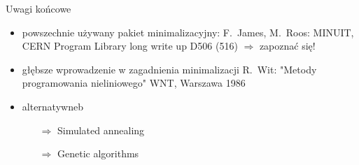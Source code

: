   \begin{frame}{Uwagi końcowe}
    \begin{itemize}
      \item powszechnie używany pakiet minimalizacyjny:
      F.~James, M.~Roos: MINUIT, CERN Program Library
      long write up D506 (516) $\Rightarrow$ zapoznać się!
      \item głębsze wprowadzenie w zagadnienia minimalizacji
      R.~Wit: "Metody programowania nieliniowego" WNT, Warszawa
      1986
      \item alternatywneb
      \begin{itemize}
        \item[$\Rightarrow$] Simulated annealing
        \item[$\Rightarrow$] Genetic algorithms
      \end{itemize}
    \end{itemize}
  \end{frame}
